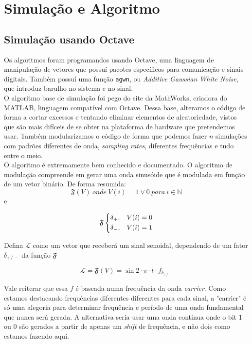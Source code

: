 \documentclass[11pt,a4paper]{report}
\begin{document}
\chapter{Simulação e Algoritmo}
	\section{Simulação usando Octave}
	
	Os algoritmos foram programandos usando Octave, uma linguagem de manipulação de vetores que possuí pacotes específicos para comunicação e sinais digitais. Também possuí uma função \texttt{agwn}, ou {\it Additive Gaussian White Noise}, que introduz barulho no sistema e no sinal.\\
	
	O algoritmo base de simulação foi pego do site da MathWorks, criadora do MATLAB, linguagem compatível com Octave.  Dessa base, alteramos o código de forma a cortar excessos e tentando eliminar elementos de aleatoriedade, vistos que são mais difíceis de se obter na plataforma de hardware que pretendemos usar. Também modularizamos o código de forma que podemos fazer $n$ simulações com padrões diferentes de onda, {\it sampling rates}, diferentes frequências e tudo entre o meio.\\
	
	O algoritmo é extremamente bem conhecido e documentado. O algoritmo de modulação compreende em gerar uma onda sinusóide que é modulada em função de um vetor binário. De forma resumida:
	\begin{equation}
	\mathfrak{F}(V)\ onde\ V(i) = 1 \lor 0\ para\ i \in \mathbb{N}
	\end{equation}
	e

	\[
	\mathfrak{F}
	\begin{dcases}
	\delta_{+}, & V(i) = 0 \\
	\delta_{-}, & V(i) = 1 \\
	\end{dcases}
	\]


	Defina $\mathcal{L}$ como um vetor que receberá um sinal senoidal, dependendo de um fator $\delta_{+/-}$ da função $\mathfrak{F}$

	\begin{equation}
	\mathcal{L} = \mathfrak{F}(V) = \sin{2 \cdot \pi \cdot t \cdot f_{\delta_{+/-}}}
	\end{equation}
	
	Vale reiterar que essa $f$ é baseada numa frequência da onda {\it carrier}. Como estamos destacando frequências diferentes diferentes para cada sinal, a "carrier" é só uma alegoria para determinar frequência e período de uma onda fundamental que nunca será gerada. A alternativa seria usar uma onda continua onde o bit $1$ ou $0$ são gerados a partir de apenas um {\it shift} de frequência, e não dois como estamos fazendo aqui.\\
	
\end{document}
